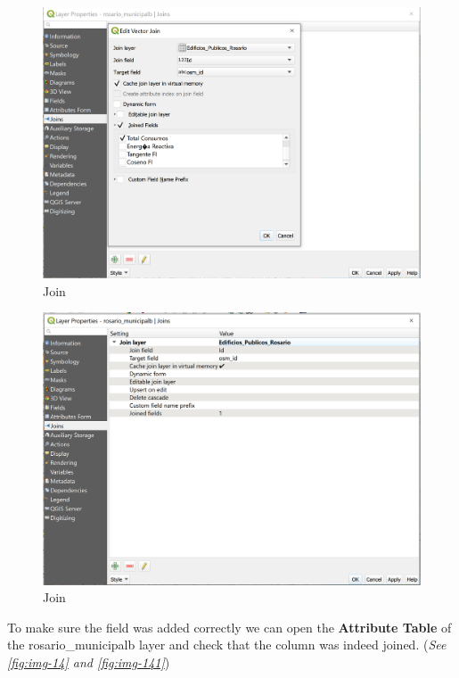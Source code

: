 \documentclass[
]{book}
\begin{document}
\begin{figure}

{\centering \includegraphics[width=1\linewidth]{images/join} 

}

\caption{Join}\label{fig:img-13}
\end{figure}
\begin{figure}

{\centering \includegraphics[width=1\linewidth]{images/join2} 

}

\caption{Join}\label{fig:img-131}
\end{figure}

To make sure the field was added correctly we can open the \textbf{Attribute Table} of the {rosario\_municipalb} layer
and check that the column was indeed joined. (\emph{See \ref{fig:img-14} and \ref{fig:img-141}})
\end{document}
